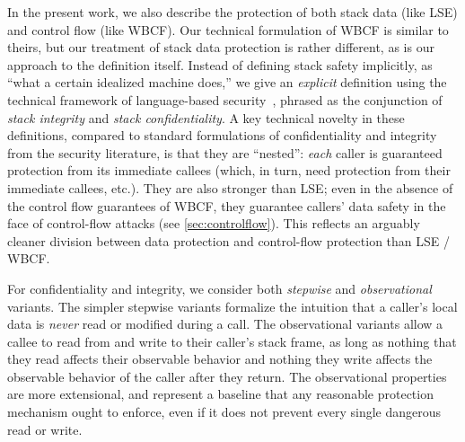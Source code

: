 \documentclass[acmsmall,review,anonymous]{acmart}\settopmatter{printfolios=true,printccs=false,printacmref=false}
\begin{document}
In the present work, we also describe the protection of both stack data (like LSE) and
control flow (like WBCF).  Our technical formulation of WBCF is similar to
theirs, but our treatment of stack data protection is rather different,
as is our approach to the definition itself. Instead of defining stack safety implicitly,
as ``what a certain idealized machine does,'' we give an
\emph{explicit} definition using the technical framework of language-based
security\ifaftersubmission~\citep{??}\fi, phrased as the conjunction of
\emph{stack integrity} and \emph{stack confidentiality}.
%
A key technical novelty in these definitions,
compared to standard formulations of confidentiality and integrity from the
security literature, is that they
are ``nested'': {\em each} caller is guaranteed protection from its
immediate callees (which, in turn, need protection from their immediate
callees, etc.). They are also stronger than LSE; even in the absence of the
control flow guarantees of WBCF, they guarantee callers'
data safety in the face of control-flow attacks (see \cref{sec:controlflow}).
This reflects an arguably cleaner division between data protection and
control-flow protection than LSE / WBCF.

For confidentiality and integrity, we consider both {\em stepwise}
and {\em observational} variants.  The simpler stepwise
variants formalize the intuition that a caller's local data is {\em never}
read or modified during a call. The observational variants
allow a callee to read from and write to their caller's stack frame, as
long as nothing that they read affects their observable behavior and nothing
they write affects the observable behavior of the caller after they return.
The observational properties are more extensional, and represent a baseline 
that any reasonable protection mechanism ought to enforce,
even if it does not prevent every single dangerous read or write.

\end{document}
